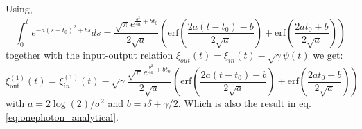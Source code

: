 Using,
\begin{equation}
    \int_{0}^{t} e^{-a(s-t_0)^2+b s}ds = \frac{\sqrt{\pi} e^{\frac{b^2}{4a}+bt_0}}{2\sqrt{a}}\left(\text{erf}\left(\frac{2a(t-t_0)-b}{2\sqrt{a}}\right) + \text{erf}\left(\frac{2at_0+b}{2\sqrt{a}}\right)\right)
\end{equation}
together with the input-output relation $\xi_{out}(t) = \xi_{in}(t) - \sqrt{\gamma}\psi(t)$ we get:
\begin{equation}
    \xi^{(1)}_\mathrm{out}(t) =  \xi_{in}^{(1)}(t) - \sqrt{\gamma} \frac{\sqrt{\pi} e^{\frac{b^2}{4a}+bt_0}}{2\sqrt{a}}\left(\text{erf}\left(\frac{2a(t-t_0)-b}{2\sqrt{a}}\right) + \text{erf}\left(\frac{2at_0+b}{2\sqrt{a}}\right)\right)
\end{equation}
with $a = 2 \log(2)/\sigma^2$ and $b = i \delta + \gamma/2$. Which is also the result in eq. \eqref{eq:onephoton_analytical}.



